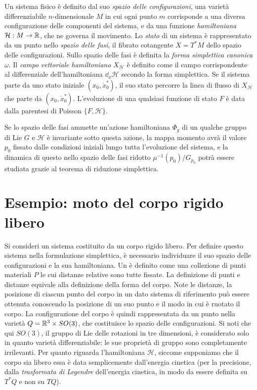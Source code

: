 Un sistema fisico è definito dal suo \emph{spazio delle configurazioni}, una varietà differenziabile $n$-dimensionale $M$ in cui ogni punto $m$ corrisponde a una diversa configurazione delle componenti del sistema, e da una funzione \emph{hamiltoniana} $\mathcal{H}: M\to \mathbb{R}$, che ne governa il movimento. Lo \emph{stato} di un sistema è rappresentato da un punto nello \emph{spazio delle fasi}, il fibrato cotangente $X = T^* M$ dello spazio delle configurazioni. Sullo spazio delle fasi è definita la \emph{forma simplettica canonica} $\omega$. Il \emph{campo vettoriale hamiltoniano} $X_{\mathcal{H}}$ è definito come il campo corrispondente al differenziale dell'hamiltoniana $\dd_{x}{\mathcal{H}}$ secondo la forma simplettica. Se il sistema parte da uno stato iniziale $(x_0, \dot{x}^*_0)$, il suo stato percorre la linea di flusso di $X_{\mathcal{H}}$ che parte da $(x_0, \dot{x}^*_0)$. L'evoluzione di una qualsiasi funzione di stato $F$ è data dalla parentesi di Poisson $\{F, \mathcal{H}\}$.

Se lo spazio delle fasi ammette un'azione hamiltoniana $\Phi_g$ di un qualche gruppo di Lie $G$ e $\mathcal{H}$ è invariante sotto questa azione, la mappa momento avrà il valore $p_0$ fissato dalle condizioni iniziali lungo tutta l'evoluzione del sistema, e la dinamica di questo nello spazio delle fasi ridotto $\mu^{-1}(p_0)/G_{p_0}$ potrà essere studiata grazie al teorema di riduzione simplettica. 

\section{Esempio: moto del corpo rigido libero}
Si consideri un sistema costituito da un corpo rigido libero. Per definire questo sistema nella formulazione simplettica, è necessario individuare il suo spazio delle configurazioni e la sua hamiltoniana. Un  è definito come una collezione di punti materiali $P$ le cui distanze relative sono tutte fissate. La definizione di punti e distanze equivale alla definizione della forma del corpo. Note le distanze, la posizione di ciascun punto del corpo in un dato sistema di riferimento può essere ottenuta conoscendo la posizione di un suo punto e il modo in cui è ruotato il corpo. La configurazione del corpo è quindi rappresentata da un punto nella varietà $Q = \mathbb{R}^3 \times SO(3)$, che costituisce lo spazio delle configurazioni. Si noti che qui $SO(3)$, il gruppo di Lie delle rotazioni in tre dimensioni, è considerato solo in quanto varietà differenziabile: le sue proprietà di gruppo sono completamente irrilevanti. Per quanto riguarda l'hamiltoniana $\mathcal{H}$, siccome supponiamo che il corpo sia libero essa è data semplicemente dall'energia cinetica (per la precisione, dalla \emph{trasformata di Legendre} dell'energia cinetica, in modo da essere definita su $T^*Q$ e non su $TQ$). 

